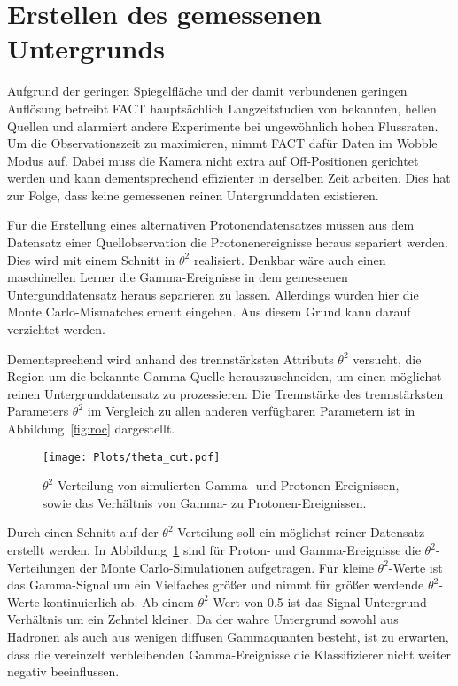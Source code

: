 \section{Erstellen des gemessenen Untergrunds}
\label{sec:makeUnter}
Aufgrund der geringen Spiegelfläche und der damit verbundenen geringen Auflösung betreibt FACT hauptsächlich Langzeitstudien von bekannten, hellen Quellen und alarmiert andere Experimente bei ungewöhnlich hohen Flussraten.
Um die Observationszeit zu maximieren, nimmt FACT dafür Daten im Wobble Modus auf. 
Dabei muss die Kamera nicht extra auf Off-Positionen gerichtet werden und kann dementsprechend effizienter in derselben Zeit arbeiten. 
Dies hat zur Folge, dass keine gemessenen reinen Untergrunddaten existieren. 

Für die Erstellung eines alternativen Protonendatensatzes müssen aus dem Datensatz einer Quellobservation die Protonenereignisse heraus separiert werden. 
Dies wird mit einem Schnitt in $\theta^{2}$ realisiert.
Denkbar wäre auch einen maschinellen Lerner die Gamma-Ereignisse in dem gemessenen Untergunddatensatz heraus separieren zu lassen.
Allerdings würden hier die Monte Carlo-Mismatches erneut eingehen. 
Aus diesem Grund kann darauf verzichtet werden.

Dementsprechend wird anhand des trennstärksten Attributs $\theta^{2}$ versucht, die Region um die bekannte Gamma-Quelle herauszuschneiden, um einen möglichst reinen Untergrunddatensatz zu prozessieren. 
Die Trennstärke des trennstärksten Parameters $\theta^{2}$ im Vergleich zu allen anderen verfügbaren Parametern ist in Abbildung~\ref{fig:roc} dargestellt. 
\begin{figure}[H]
  \centering
  \texttt{[image: Plots/theta\_cut.pdf]}
  \caption{$\theta^{2}$ Verteilung von simulierten Gamma- und Protonen-Ereignissen, sowie das Verhältnis von Gamma- zu Protonen-Ereignissen.}
  \label{fig:thetacut}
\end{figure}
Durch einen Schnitt auf der $\theta^{2}$-Verteilung soll ein möglichst reiner Datensatz erstellt werden. 
In Abbildung~\ref{fig:thetacut} sind für Proton- und Gamma-Ereignisse die $\theta^{2}$-Verteilungen der Monte Carlo-Simulationen aufgetragen. 
Für kleine $\theta^{2}$-Werte ist das Gamma-Signal um ein Vielfaches größer und nimmt für größer werdende $\theta^{2}$-Werte kontinuierlich ab. 
Ab einem $\theta^{2}$-Wert von \num{0.5} ist das Signal-Untergrund-Verhältnis um ein Zehntel kleiner.
Da der wahre Untergrund sowohl aus Hadronen als auch aus wenigen diffusen Gammaquanten besteht, ist zu erwarten, dass die vereinzelt verbleibenden Gamma-Ereignisse die Klassifizierer nicht weiter negativ beeinflussen.

